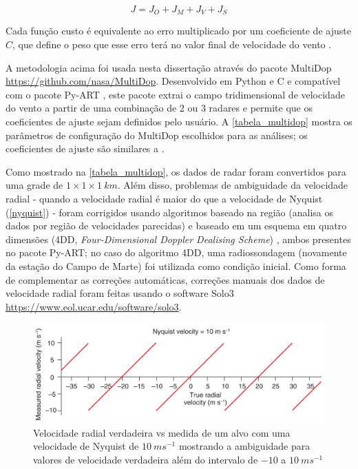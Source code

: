 \begin{equation}
J=J_O+J_M+J_V+J_S
\end{equation}

Cada função custo é equivalente ao erro multiplicado por um coeficiente de ajuste $C$, que define o peso que esse erro terá no valor final de velocidade do vento \cite{Potvin2012b}.

A metodologia acima foi usada nesta dissertação através do pacote MultiDop \url{https://github.com/nasa/MultiDop}. Desenvolvido em Python e C e compatível com o pacote Py-ART \cite{Helmus2016}, este pacote extrai o campo tridimensional de velocidade do vento a partir de uma combinação de 2 ou 3 radares e permite que os coeficientes de ajuste sejam definidos pelo usuário. A \autoref{tabela_multidop} mostra os parâmetros de configuração do MultiDop escolhidos para as análises; os coeficientes de ajuste são similares a .



Como mostrado na \autoref{tabela_multidop}, os dados de radar foram convertidos para uma grade de $1 \times 1 \times 1\:km$. Além disso, problemas de ambiguidade da velocidade radial - quando a velocidade radial é maior do que a velocidade de Nyquist (\autoref{nyquist}) - foram corrigidos usando algoritmos baseado na região (analisa os dados por região de velocidades parecidas) e baseado em um esquema em quatro dimensões (4DD, \textit{Four-Dimensional Doppler Dealising Scheme}) \cite{James2001}, ambos presentes no pacote Py-ART; no caso do algoritmo 4DD, uma radiossondagem (novamente da estação do Campo de Marte) foi utilizada como condição inicial. Como forma de complementar as correções automáticas, correções manuais dos dados de velocidade radial foram feitas usando o software Solo3 \url{https://www.eol.ucar.edu/software/solo3}.

\begin{figure}[htb]
	\begin{center}
		\caption{Velocidade radial verdadeira vs medida de um alvo com uma velocidade de Nyquist de $10\:ms^{-1}$ mostrando a ambiguidade para valores de velocidade verdadeira além do intervalo de $-10$ a $10\:ms^{-1}$} 
		\label{nyquist}
		\includegraphics[width=\columnwidth]{figs/nyquist_rauber.png}
	\end{center}
\end{figure}

